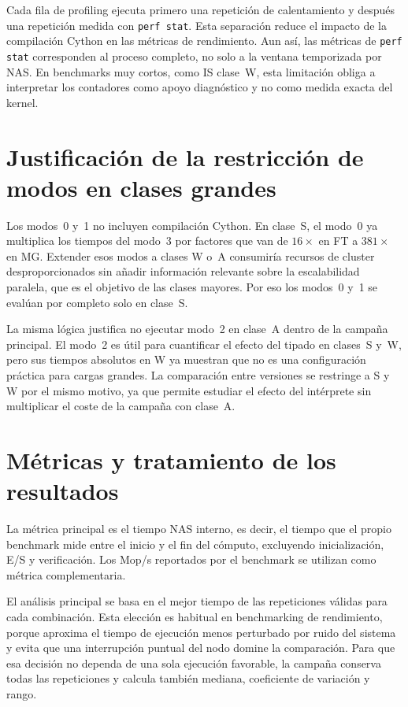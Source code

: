 Cada fila de profiling ejecuta primero una repetición de calentamiento y
después una repetición medida con \texttt{perf stat}. Esta separación reduce el
impacto de la compilación Cython en las métricas de rendimiento. Aun así, las
métricas de \texttt{perf stat} corresponden al proceso completo, no solo a la
ventana temporizada por NAS. En benchmarks muy cortos, como IS clase~W, esta
limitación obliga a interpretar los contadores como apoyo diagnóstico y no como
medida exacta del kernel.


\section{Justificación de la restricción de modos en clases grandes}
\label{sec:justificacion-modos}

Los modos~0 y~1 no incluyen compilación Cython. En clase~S, el modo~0 ya
multiplica los tiempos del modo~3 por factores que van de $16\times$ en FT a
$381\times$ en MG. Extender esos modos a clases W o~A consumiría
recursos de cluster desproporcionados sin añadir información relevante sobre la
escalabilidad paralela, que es el objetivo de las clases mayores. Por eso los
modos~0 y~1 se evalúan por completo solo en clase~S.

La misma lógica justifica no ejecutar modo~2 en clase~A dentro de la campaña
principal. El modo~2 es útil para cuantificar el efecto del tipado en clases~S
y~W, pero sus tiempos absolutos en W ya muestran que no es una configuración
práctica para cargas grandes. La comparación entre versiones se restringe a S y
W por el mismo motivo, ya que permite estudiar el efecto del intérprete sin multiplicar
el coste de la campaña con clase~A.


\section{Métricas y tratamiento de los resultados}
\label{sec:tratamiento-resultados}

La métrica principal es el tiempo NAS interno, es decir, el tiempo que el propio
benchmark mide entre el inicio y el fin del cómputo, excluyendo inicialización,
E/S y verificación. Los Mop/s reportados por el benchmark se utilizan como
métrica complementaria.

El análisis principal se basa en el mejor tiempo de las repeticiones válidas
para cada combinación. Esta elección es habitual en benchmarking de rendimiento,
porque aproxima el tiempo de ejecución menos perturbado por ruido del sistema y evita
que una interrupción puntual del nodo domine la comparación. Para que esa
decisión no dependa de una sola ejecución favorable, la campaña conserva todas
las repeticiones y calcula también mediana, coeficiente de variación y rango.

